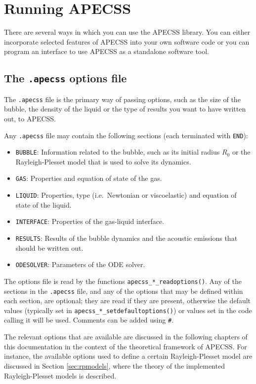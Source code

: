 \section{Running APECSS}

There are several ways in which you can use the APECSS library. You can either incorporate selected features of APECSS into your own software code or you can program an interface to use APECSS as a standalone software tool. 

\subsection{The {\tt *.apecss} options file}

The {\tt *.apecss} file is the primary way of passing options, such as the size of the bubble, the density of the liquid or the type of results you want to have written out, to APECSS. 

Any {\tt *.apecss} file may contain the following sections (each terminated with {\tt END}):
\vspace{-1em}
\begin{itemize}[noitemsep]
  \item {\tt BUBBLE}: Information related to the bubble, such as its initial radius $R_0$ or the Rayleigh-Plesset model that is used to solve its dynamics.
  \item {\tt GAS}: Properties and equation of state of the gas.
  \item {\tt LIQUID}: Properties, type (i.e.~Newtonian or viscoelastic) and equation of state of the liquid.
  \item {\tt INTERFACE}: Properties of the gas-liquid interface. 
  \item {\tt RESULTS}: Results of the bubble dynamics and the acoustic emissions that should be written out.
  \item {\tt ODESOLVER}: Parameters of the ODE solver.
\end{itemize}
The options file is read by the functions {\tt apecss\_*\_readoptions()}. Any of the sections in the {\tt *.apecss} file, and any of the options that may be defined within each section, are optional; they are read if they are present, otherwise the default values (typically set in {\tt apecss\_*\_setdefaultoptions()}) or values set in the code calling it will be used. Comments can be added using {\tt \#}.

The relevant options that are available are discussed in the following chapters of this documentation in the context of the theoretical framework of APECSS. For instance, the available options used to define a certain Rayleigh-Plesset model are discussed in Section \ref{sec:rpmodels}, where the theory of the implemented Rayleigh-Plesset models is described. 


